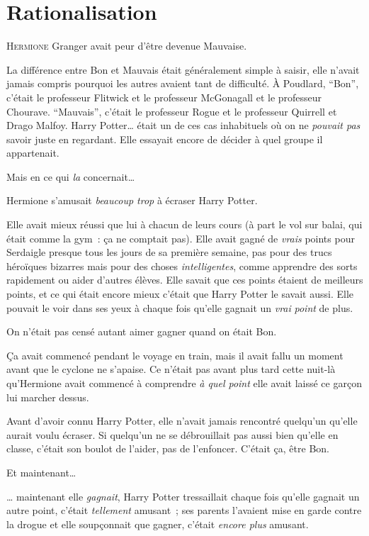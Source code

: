 \chapter{Rationalisation}

\lettrine{H}{ermione} Granger avait peur d'être devenue Mauvaise.

\hplettrineextrapara
La différence entre Bon et Mauvais était généralement simple à saisir, elle n'avait jamais compris pourquoi les autres avaient tant de difficulté. À Poudlard, “Bon”, c'était le professeur Flitwick et le professeur McGonagall et le professeur Chourave. “Mauvais”, c'était le professeur Rogue et le professeur Quirrell et Drago Malfoy. Harry Potter… était un de ces cas inhabituels où on ne \emph{pouvait pas} savoir juste en regardant. Elle essayait encore de décider à quel groupe il appartenait.

Mais en ce qui \emph{la} concernait…

Hermione s'amusait \emph{beaucoup trop} à écraser Harry Potter.

Elle avait mieux réussi que lui à chacun de leurs cours (à part le vol sur balai, qui était comme la gym~: ça ne comptait pas). Elle avait gagné de \emph{vrais} points pour Serdaigle presque tous les jours de sa première semaine, pas pour des trucs héroïques bizarres mais pour des choses \emph{intelligentes}, comme apprendre des sorts rapidement ou aider d'autres élèves. Elle savait que ces points étaient de meilleurs points, et ce qui était encore mieux c'était que Harry Potter le savait aussi. Elle pouvait le voir dans ses yeux à chaque fois qu'elle gagnait un \emph{vrai} \emph{point} de plus.

On n'était pas censé autant aimer gagner quand on était Bon.

Ça avait commencé pendant le voyage en train, mais il avait fallu un moment avant que le cyclone ne s'apaise. Ce n'était pas avant plus tard cette nuit-là qu'Hermione avait commencé à comprendre \emph{à quel point} elle avait laissé ce garçon lui marcher dessus.

Avant d'avoir connu Harry Potter, elle n'avait jamais rencontré quelqu'un qu'elle aurait voulu écraser. Si quelqu'un ne se débrouillait pas aussi bien qu'elle en classe, c'était son boulot de l'aider, pas de l'enfoncer. C'était ça, être Bon.

Et maintenant…

… maintenant elle \emph{gagnait}, Harry Potter tressaillait chaque fois qu'elle gagnait un autre point, c'était \emph{tellement} amusant~; ses parents l'avaient mise en garde contre la drogue et elle soupçonnait que gagner, c'était \emph{encore plus} amusant.

